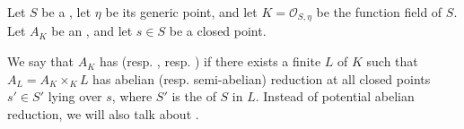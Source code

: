 \begin{definition} \label{definition:potential_good_and_semi_abelian_reduction_for_an_abelian_variety_over_the_function_field_of_a_dedekind_scheme}
    Let $S$ be a , let $\eta$ be its generic point, and let $K = \mathcal{O}_{S, \eta}$ be the function field of $S$. Let $A_K$ be an , and let $s \in S$ be a closed point.

    We say that $A_K$ has  (resp. , resp. ) if there exists a finite  $L$ of $K$ such that $A_L = A_K \times_K L$ has abelian (resp. semi-abelian) reduction at all closed points $s' \in S'$ lying over $s$, where $S'$ is the  of $S$ in $L$. Instead of potential abelian reduction, we will also talk about .
\end{definition}
